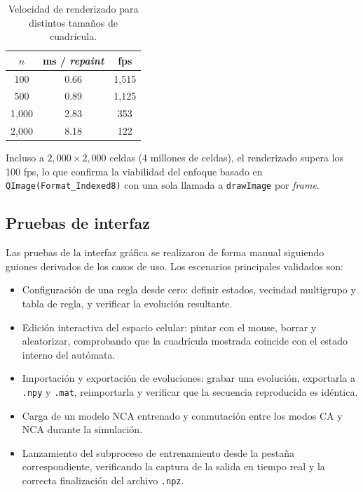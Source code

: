 \begin{table}[H]
    \centering
    \begin{tabular}{c|c|c}
        \hline
        $n$ & ms / \textit{repaint} & fps \\ \hline
        100  & 0.66 & 1,515 \\ \hline
        500  & 0.89 & 1,125 \\ \hline
        1,000 & 2.83 &  353 \\ \hline
        2,000 & 8.18 &  122 \\ \hline
    \end{tabular}
    \caption{Velocidad de renderizado para distintos tamaños de cuadrícula.}
    \label{tab:perf-render}
\end{table}

Incluso a $2{,}000 \times 2{,}000$ celdas (4 millones de celdas), el renderizado supera los 100 fps, lo que confirma la viabilidad del enfoque basado en \texttt{QImage(Format\_Indexed8)} con una sola llamada a \texttt{drawImage} por \textit{frame}.

\subsection{Pruebas de interfaz}

Las pruebas de la interfaz gráfica se realizaron de forma manual siguiendo guiones derivados de los casos de uso. Los escenarios principales validados son:

\begin{itemize}
    \item Configuración de una regla desde cero: definir estados, vecindad multigrupo y tabla de regla, y verificar la evolución resultante.
    \item Edición interactiva del espacio celular: pintar con el mouse, borrar y aleatorizar, comprobando que la cuadrícula mostrada coincide con el estado interno del autómata.
    \item Importación y exportación de evoluciones: grabar una evolución, exportarla a \texttt{.npy} y \texttt{.mat}, reimportarla y verificar que la secuencia reproducida es idéntica.
    \item Carga de un modelo NCA entrenado y conmutación entre los modos CA y NCA durante la simulación.
    \item Lanzamiento del subproceso de entrenamiento desde la pestaña correspondiente, verificando la captura de la salida en tiempo real y la correcta finalización del archivo \texttt{.npz}.
\end{itemize}

